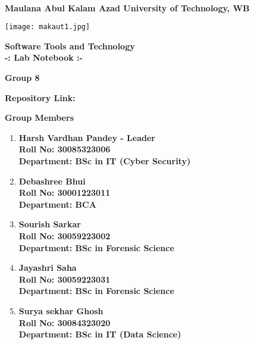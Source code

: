 \documentclass[a4paper,12pt]{article}
\begin{document}
\begin{titlepage}
    \centering
    \vspace*{0 cm}
    \Large\\
    \textbf{Maulana Abul Kalam Azad University of Technology, WB}
    \vspace{0.5cm}
    
    \texttt{[image: makaut1.jpg]} %
    \vspace{0.5cm}
    
    \LARGE
    \textbf{{Software Tools and Technology\\
        -: Lab Notebook :-}}
    \vspace{0.5cm}
    
    \large
    \textbf{Group 8}
    \vspace{1 cm}
    
    \textbf{Repository Link:} \href{https://github.com/vardhanbhardvaj/STT-GROUP-8}
    \vspace{1cm}
    
    \textbf{Group Members}
    \vspace{0.5cm}

    \normalsize
    \begin{enumerate}
        \item \textbf{Harsh Vardhan Pandey - Leader}\\ 
              \textbf{Roll No: 30085323006}\\   
              \textbf{Department: BSc in IT (Cyber Security)}
        \item \textbf{Debashree Bhui}\\
              \textbf{Roll No: 30001223011}\\
              \textbf{Department: BCA}
        \item \textbf{Sourish Sarkar}\\
              \textbf{Roll No: 30059223002}\\
              \textbf{Department: BSc in Forensic Science}
        \item \textbf{Jayashri Saha}\\
              \textbf{Roll No: 30059223031}\\
              \textbf{Department: BSc in Forensic Science}
        \item \textbf{Surya sekhar Ghosh}\\
              \textbf{Roll No: 30084323020}\\
              \textbf{Department: BSc in IT (Data Science)}
    \end{enumerate}
    \vspace{0.8 cm}

    \end{titlepage}
\end{document}
